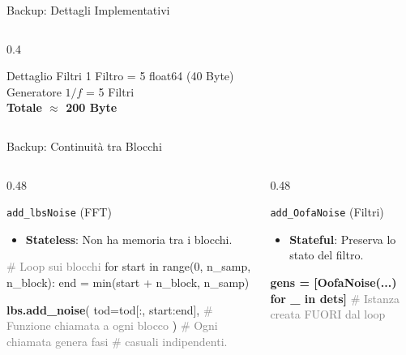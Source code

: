 \documentclass[10pt, aspectratio=169, handout]{beamer}
\begin{document}
\begin{frame}{Backup: Dettagli Implementativi}
\begin{columns}[T]
\begin{column}{0.4\textwidth}
      \vspace{0.4cm}
      \begin{exampleblock}{Dettaglio Filtri}
        \scriptsize
        1 Filtro = 5 float64 (40 Byte) \\
        Generatore $1/f$ = 5 Filtri \\
        \textbf{Totale $\approx$ 200 Byte}
      \end{exampleblock}
      
    \end{column}
  \end{columns}
\end{frame}




\begin{frame}[fragile]{Backup: Continuità tra Blocchi}
  
  \begin{columns}[T]
    \begin{column}{0.48\textwidth}
      \begin{block}{\texttt{add\_lbsNoise} (FFT)}
        \fontsize{7pt}{8pt}\selectfont
        \begin{itemize}
            \item \textbf{Stateless}: Non ha memoria tra i blocchi.
        \end{itemize}
        \begin{semiverbatim}
\textcolor{gray}{# Loop sui blocchi}
for start in range(0, n_samp, n_block):
    end = min(start + n_block, n_samp)
    
    \textcolor{orange!80!black}{\textbf{lbs.add_noise}}(
        tod=tod[:, start:end],
        \textcolor{gray}{# Funzione chiamata a ogni blocco}
    )
    \textcolor{gray}{# Ogni chiamata genera fasi}
    \textcolor{gray}{# casuali indipendenti.}
        \end{semiverbatim}
        \centering
      \end{block}
    \end{column}

    \begin{column}{0.48\textwidth}
      \begin{block}{\texttt{add\_OofaNoise} (Filtri)}
        \fontsize{7pt}{8pt}\selectfont
        \begin{itemize}
            \item \textbf{Stateful}: Preserva lo stato del filtro.
        \end{itemize}
        \begin{semiverbatim}
\textcolor{orange!80!black}{\textbf{gens = [OofaNoise(...) for _ in dets]}}
\textcolor{gray}{# Istanza creata FUORI dal loop}


\end{semiverbatim}
\end{block}
\end{column}
\end{columns}
\end{frame}
\end{document}
